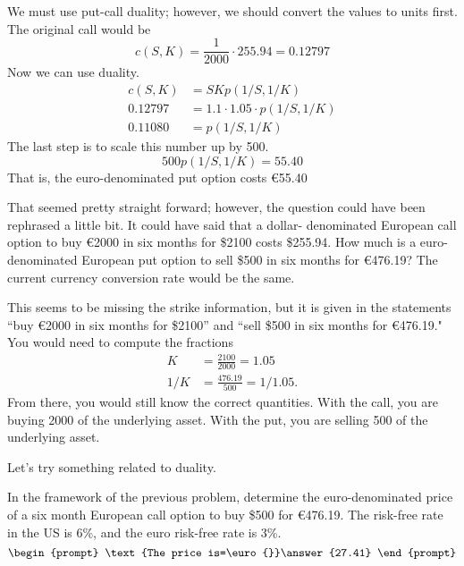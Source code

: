 \documentclass{ximera}
\begin{document}
\begin{solution}
We must use put-call duality; however, we should convert the values to units first. The original call would be
	\begin{equation*}
	c(S,K)=\frac{1}{2000}\cdot 255.94=0.12797
	\end{equation*}
Now we can use duality.
	\begin{align*}
	c(S,K)&=SKp(1/S, 1/K)\\
	0.12797&=1.1\cdot 1.05\cdot p(1/S, 1/K)\\
	0.11080&=p(1/S, 1/K) 
	\end{align*}
The last step is to scale this number up by 500.
	\begin{equation*}
	500p(1/S, 1/K)=55.40
	\end{equation*}
That is, the euro-denominated put option costs \euro{55.40}
\end{solution}

That seemed pretty straight forward; however, the question could have been rephrased a little bit. It could have said that a dollar- denominated European call option to buy \euro{2000} in six months for \$2100 costs \$255.94. How much is a euro-denominated European put option to sell \$500 in six months for \euro{476.19}? The current currency conversion rate would be the same.

This seems to be missing the strike information, but it is given in the statements ``buy \euro{2000} in six months for \$2100'' and ``sell \$500 in six months for \euro{476.19}." You would need to compute the fractions
\begin{align*}
K&=\frac{2100}{2000}=1.05\\
1/K&=\frac{476.19}{500}=1/1.05.
\end{align*}
From there, you would still know the correct quantities. With the call, you are buying 2000 of the underlying asset. With the put, you are selling 500 of the underlying asset.

Let's try something related to duality.

\begin{problem}
In the framework of the previous problem, determine the euro-denominated price of a six month European call option to buy \$500 for \euro{476.19}. The risk-free rate in the US is 6\%, and the euro risk-free rate is 3\%.
	\[
	\begin{prompt}
	\text{The price is=\euro{}}\answer{27.41}
	\end{prompt}
	\]
\end{problem}
\end{document}
